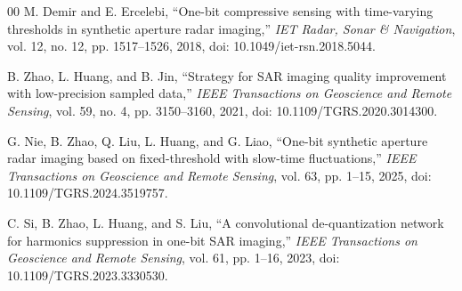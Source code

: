 \documentclass[conference]{IEEEtran}
\begin{document}
\begin{thebibliography}{00}
M. Demir and E. Ercelebi, ``One-bit compressive sensing with time-varying thresholds in synthetic aperture radar imaging,'' \textit{IET Radar, Sonar \& Navigation}, vol. 12, no. 12, pp. 1517--1526, 2018, doi: 10.1049/iet-rsn.2018.5044.

B. Zhao, L. Huang, and B. Jin, ``Strategy for SAR imaging quality improvement with low-precision sampled data,'' \textit{IEEE Transactions on Geoscience and Remote Sensing}, vol. 59, no. 4, pp. 3150--3160, 2021, doi: 10.1109/TGRS.2020.3014300.

G. Nie, B. Zhao, Q. Liu, L. Huang, and G. Liao, ``One-bit synthetic aperture radar imaging based on fixed-threshold with slow-time fluctuations,'' \textit{IEEE Transactions on Geoscience and Remote Sensing}, vol. 63, pp. 1--15, 2025, doi: 10.1109/TGRS.2024.3519757.

C. Si, B. Zhao, L. Huang, and S. Liu, ``A convolutional de-quantization network for harmonics suppression in one-bit SAR imaging,'' \textit{IEEE Transactions on Geoscience and Remote Sensing}, vol. 61, pp. 1--16, 2023, doi: 10.1109/TGRS.2023.3330530.
\end{thebibliography}
\end{document}
